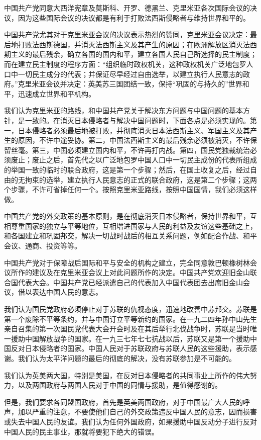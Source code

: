 中国共产党同意大西洋宪章及莫斯科、开罗、德黑兰、克里米亚各次国际会议的决议，因为这些国际会议的决议都是有利于打败法西斯侵略者与维持世界和平的。

中国共产党尤其对于克里米亚会议的决议表示热烈的赞同，克里米亚会议决定：最后地打败法西斯德国，并消灭法西斯主义及其产生的原因；在欧洲解放区消灭法西期主义的最后残余，确立各国的国内和平，建立各国人民自己所选择的民主制度；而在建立民主制度的程序方面：“组织临时政权机关，这种政权机关广泛地包罗人口中一切民主成分的代表；并保证尽早经过自由选举，以建立执行人民意志的政府。”克里米亚会议并决定：英美苏三国团结一致，保持“巩固的与持久的”世界和平，迅速成立世界和平机构。

我们认为克里米亚的路线，和中国共产党关于解决东方问题与中国问题的基本方针，是一致的。在消灭日本侵略者与解决中国问题时，下面各点是必须实现的。第一，日本侵略者必须最后地被打败，并彻底消灭日本法西斯主义、军国主义及其产生的原因，不许中途妥协。第二，中国法西斯主义的最后残余必须被消灭，不许保留丝毫。第三，中国必须建立国内和平，不许再打内战。第四，国民党独裁统治必须废止；废止之后，首先代之以广泛地包罗中国人口中一切民主成份的代表所组成的举国一致的临时的联合政府，这是第一个步骤；然后，在国土收复之后，经过自由的无拘束的选举，建立执行人民意志的正式的联合政府，这是第二个步骤；这两个步骤，不许可省掉任何一个。按照克里米亚路线，按照中国国情，我们必须这样做。

中国共产党的外交政策的基本原则，是在彻底消灭日本侵略者，保持世界和平，互相尊重国家的独立与平等地位，互相增进国家与人民的利益及友谊这些基础之上，和各国建立和巩固邦交，解决一切战时战后的相互关系问题，例如配合作战、和平会议、通商、投资等等。

中国共产党对于保障战后国际和平与安全的机构之建立，完全同意敦巴顿橡树林会议所作的建议及在克里米亚会议上对此问题所作的决定。中国共产党欢迎旧金山联合国代表大会。中国共产党已经派遣自己的代表加入中国代表团去出席旧金山会议，借以表达中国人民的意志。

我们认为国民党政府必须停止对于苏联的仇视态度，迅速地改善中苏邦交。苏联是第一个废除不平等条约，并与中国订立平等新约的国家。在一九二四年孙中山先生亲自召集的第一次国民党代表大会开会时及在其后举行北伐战争时，苏联是当时唯一援助中国解放战争的国家。在一九三七年七七抗战以后，苏联又是第一个援助中国反对日本侵略者的国家。中国人民对于苏联政府与苏联人民的这些援助，表示感谢。我们认为太平洋问题的最后的彻底的解决，没有苏联参加是不可能的。

我们认为英美两大国，特别是美国，在反对日本侵略者的共同事业上所作的伟大努力，以及两国政府与两国人民对于中国的同情与援助，是值得感谢的。

但是，我们要求各同盟国政府，首先是英美两国政府，对于中国最广大人民的呼声，加以严重的注意，不要使他们自己的外交政策违反中国人民的意志，因而损害或失去中国人民的友谊。我们认为任何外国政府，如果援助中国反动分子进行反对中国人民的民主事业，那就将要犯下绝大的错误。

